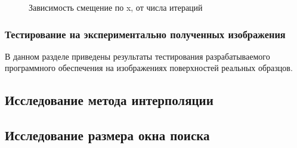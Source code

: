 \begin{figure}[ht]
\caption{Зависимость смещение по x, от числа итераций}
\label{pic:gray_set_func_iter_vector}
\end{figure}

\subsubsection{Тестирование на экспериментально полученных изображения}
В данном разделе приведены результаты тестирования разрабатываемого программного обеспечения на изображениях поверхностей реальных образцов.

\subsection{Исследование метода интерполяции}

\subsection{Исследование размера окна поиска}
